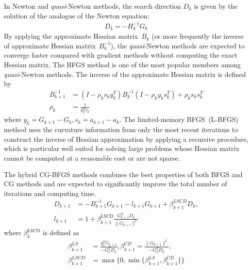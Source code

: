 \documentclass[aps,prl,reprint,amsmath,amssymb]{revtex4-1}
\begin{document}
In Newton and \emph{quasi}-Newton  methods, the search direction $D_{k}$ is given by the solution of the analogue of the Newton equation:
%
\begin{equation} \label{eq:newton_dir}
\begin{split}
D_{k} = -H_{k}^{-1}G_{k}
\end{split}
\end{equation}
%
By applying the approximate Hessian matrix~$B_{k}$ (or more frequently the inverse of approximate Hessian matrix~$B_{k}^{-1}$),  the \emph{quasi}-Newton methods are expected to converge faster compared with gradient methods without computing the exact Hessian matrix. The BFGS method is one of the most popular members among  \emph{quasi}-Newton methods. The inverse of the approximate Hessian matrix is defined by 
%
\begin{equation} \label{eq:bfgs_inverH}
\begin{split}
B_{k+1}^{-1}  &= (I - \rho_{k}s_{k}y_{k}^{T})B_{k}^{-1}(I - \rho_{k}y_{k}s_{k}^{T}) + \rho_{k}s_{k}s_{k}^{T} \\
\rho_{k} &= \frac{1}{y_{k}^{T}s_{k}}
\end{split}
\end{equation}
%
where $y_{k} = G_{k+1} - G_{k}, s_{k} = a_{k+1} - a_{k}$.
The limited-memory BFGS~(L-BFGS) method uses the curvature information from only the most recent iterations to construct the inverse of Hessian approximation by applying a recursive procedure, which is particular well suited for solving large problems whose Hessian matrix cannot be computed at a reasonable cost or are not sparse.

The hybrid CG-BFGS methods combines the best properties of both BFGS and CG methods and are expected to significantly improve the total number of iterations and computing time. 
%
\begin{equation} \label{eq:hybrid_dir}
\begin{split}
D_{k+1} &= -B_{k+1}^{-1}G_{k+1} - l_{k+1}G_{k+1} + \beta_{k+1}^{LSCD}D_{k}, \\
l_{k+1} &= 1 + \beta_{k+1}^\text{LSCD}\frac{G_{k+1}^{T}D_{k}}{\lVert G_{k+1}\rVert^{2}}
\end{split}
\end{equation}
%
where $\beta_{k}^\text{LSCD}$ is defined as 
%
\begin{equation} \label{eq:beta_LSCD}
\begin{split}
\beta_{k+1}^{LS} &= \frac{y_{k}^{T}G_{k+1}}{-G_{k}^{T}D_{k}}, \beta_{k+1}^{CD} = \frac{\lVert G_{k+1}\rVert^2}{-G_{k}^{T}D_{k}}, \\
\beta_{k+1}^{LSCD} &= \max\Big\{0, \min\Big\{\beta_{k+1}^{LS}, \beta_{k+1}^{CD}\Big\}\Big\}
\end{split}
\end{equation}
%
\end{document}
